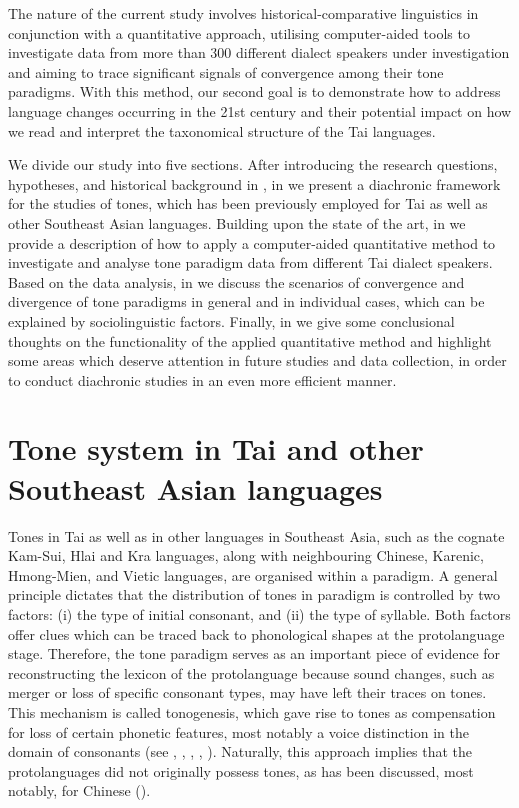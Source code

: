 \documentclass[output=paper]{langscibook}
\begin{document}
The nature of the current study involves historical-comparative linguistics in conjunction with a quantitative approach, utilising computer-aided tools to investigate data from more than 300 different dialect speakers under investigation and aiming to trace significant signals of convergence among their tone paradigms. With this method, our second goal is to demonstrate how to address language changes occurring in the 21st century and their potential impact on how we read and interpret the taxonomical structure of the Tai languages.

We divide our study into five sections. After introducing the research questions, hypotheses, and historical background in , in  we present a diachronic framework for the studies of tones, which has been previously employed for Tai as well as other Southeast Asian languages. Building upon the state of the art, in  we provide a description of how to apply a computer-aided quantitative method to investigate and analyse tone paradigm data from different Tai dialect speakers. Based on the data analysis, in  we discuss the scenarios of convergence and divergence of tone paradigms in general and in individual cases, which can be explained by sociolinguistic factors. Finally, in  we give some conclusional thoughts on the functionality of the applied quantitative method and highlight some areas which deserve attention in future studies and data collection, in order to conduct diachronic studies in an even more efficient manner.

\section{Tone system in Tai and other Southeast Asian languages}
\label{sec:yurayong:2}
Tones in Tai as well as in other languages in Southeast Asia, such as the cognate Kam-Sui, Hlai and Kra languages, along with neighbouring Chinese, Karenic, Hmong-Mien, and Vietic languages, are organised within a paradigm. A general principle dictates that the distribution of tones in paradigm is controlled by two factors: (i) the type of initial consonant, and (ii) the type of syllable. Both factors offer clues which can be traced back to phonological shapes at the protolanguage stage. Therefore, the tone paradigm serves as an important piece of evidence for reconstructing the lexicon of the protolanguage because sound changes, such as merger or loss of specific consonant types, may have left their traces on tones. This mechanism is called tonogenesis, which gave rise to tones as compensation for loss of certain phonetic features, most notably a voice distinction in the domain of consonants (see \citealt{Wulff1934}, \citealt{Haudricourt1954}, \citealt{Ferlus2004}, \citealt{Kingston2011}, \citealt{MichaudSands2020}). Naturally, this approach implies that the protolanguages did not originally possess tones, as has been discussed, most notably, for Chinese (\cites[593]{Handel2014}[182]{Hill2019}).
\end{document}
